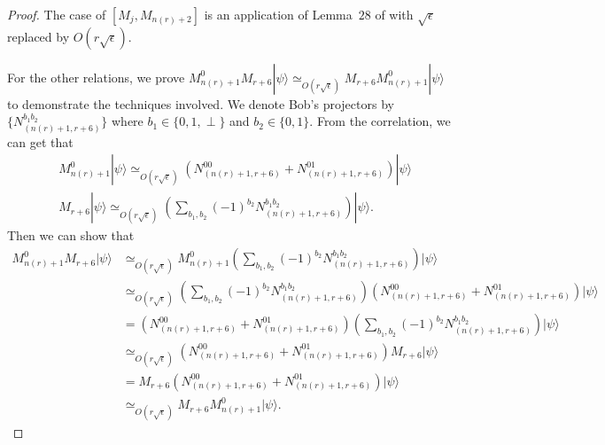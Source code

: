 \documentclass[11pt,letterpaper]{article}
\newcommand{\ket}[1]{|#1\rangle}
\newcommand{\1}{\mathbb{1}}
\newcommand{\nr}{n(r)}
\newcommand{\se}{\sqrt{\epsilon}}
\newcommand{\appd}[1]{\simeq_{#1}}
\theoremstyle{definition}
\begin{document}
\begin{proof}
	The case of $[M_j, M_{\nr+2}]$ is an application of Lemma~$28$ of \cite{coladan2017verifier} with $\se$ replaced by $O(r\se)$.
	
	For the other relations, we prove $M_{\nr+1}^0M_{r+6} \ket{\psi} \appd{O(r\se)} M_{r+6}M_{\nr+1}^0 \ket{\psi}$ to demonstrate 
	the techniques involved. We denote Bob's projectors by $\{ N_{(\nr+1, r+6)}^{b_1 b_2} \}$ where $b_1 \in \{0, 1, \perp\}$ and
	$b_2 \in \{0,1\}$. From the correlation, we can get that 
	\begin{align*}
		&M_{\nr+1}^0 \ket{\psi} \appd{O(r\se)} (N_{(\nr+1, r+6)}^{00} + N_{(\nr+1, r+6)}^{01}) \ket{\psi} \\
		&M_{r+6} \ket{\psi} \appd{O(r\se)} (\sum_{b_1, b_2} (-1)^{b_2}N_{(\nr+1, r+6)}^{b_1b_2})\ket{\psi}.
	\end{align*}
	Then we can show that
	\begin{align*}
		M_{\nr+1}^0 M_{r+6} \ket{\psi} &\appd{O(r\se)} M_{\nr+1}^0 (\sum_{b_1, b_2} (-1)^{b_2}N_{(\nr+1, r+6)}^{b_1b_2})\ket{\psi}\\
		&\appd{O(r\se)}(\sum_{b_1, b_2} (-1)^{b_2}N_{(\nr+1, r+6)}^{b_1b_2}) (N_{(\nr+1, r+6)}^{00} + N_{(\nr+1, r+6)}^{01})
		\ket{\psi} \\
		&= (N_{(\nr+1, r+6)}^{00} + N_{(\nr+1, r+6)}^{01}) (\sum_{b_1, b_2} (-1)^{b_2}N_{(\nr+1, r+6)}^{b_1b_2})  \ket{\psi} \\
		& \appd{O(r\se)} (N_{(\nr+1, r+6)}^{00} + N_{(\nr+1, r+6)}^{01}) M_{r+6} \ket{\psi} \\
		&= M_{r+6}  (N_{(\nr+1, r+6)}^{00} + N_{(\nr+1, r+6)}^{01}) \ket{\psi} \\
		& \appd{O(r\se)} M_{r+6}M_{\nr+1}^0 \ket{\psi}.
	\end{align*}
\end{proof}
\end{document}
